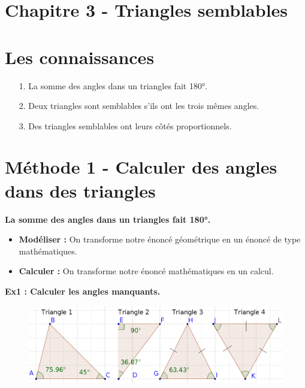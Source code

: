 



\setlength{\columnseprule}{1pt}

\horrule{2px}
\section*{Chapitre 3 - Triangles semblables}
\horrule{2px}

\section*{Les connaissances}

\begin{enumerate}
  \item[1.] La somme des angles dans un triangles fait 180°.
  \item[2.] Deux triangles sont semblables s'ils ont les trois mêmes angles.
  \item[3.] Des triangles semblables ont leurs côtés proportionnels. 
\end{enumerate}

\section*{Méthode 1 - Calculer des angles dans des triangles}

\textbf{La somme des angles dans un triangles fait 180°.} 

\begin{itemize}
  \item \textbf{Modéliser : } On transforme notre énoncé géométrique en un énoncé de type mathématiques.
  \item \textbf{Calculer : } On transforme notre énoncé mathématiques en un calcul. 
\end{itemize}

\horrule{1px}
\textbf{Ex1 : Calculer les angles manquants.}

\begin{figure}[H]
  \centering
  \includegraphics[width=0.7\linewidth]{4x3-triangles-semblables/m1-calculer-angles-triangles.png}
\end{figure}

